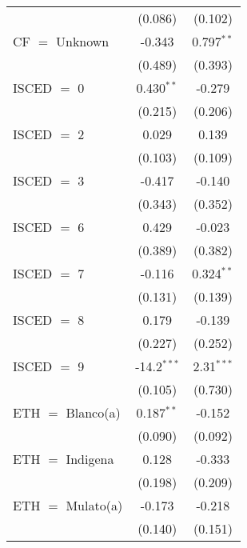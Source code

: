 \begin{table}[htbp!]
\begin{adjustbox}{width = 1\textwidth, max height = 0.95\textheight, center}
\begin{threeparttable}[b]
\begin{tabular}{lcc}
                                           & (0.086)        & (0.102)\\   
            CF $=$ Unknown                 & -0.343         & 0.797$^{**}$\\   
                                           & (0.489)        & (0.393)\\   
            ISCED $=$ 0                    & 0.430$^{**}$   & -0.279\\   
                                           & (0.215)        & (0.206)\\   
            ISCED $=$ 2                    & 0.029          & 0.139\\   
                                           & (0.103)        & (0.109)\\   
            ISCED $=$ 3                    & -0.417         & -0.140\\   
                                           & (0.343)        & (0.352)\\   
            ISCED $=$ 6                    & 0.429          & -0.023\\   
                                           & (0.389)        & (0.382)\\   
            ISCED $=$ 7                    & -0.116         & 0.324$^{**}$\\   
                                           & (0.131)        & (0.139)\\   
            ISCED $=$ 8                    & 0.179          & -0.139\\   
                                           & (0.227)        & (0.252)\\   
            ISCED $=$ 9                    & -14.2$^{***}$  & 2.31$^{***}$\\   
                                           & (0.105)        & (0.730)\\   
            ETH $=$ Blanco(a)              & 0.187$^{**}$   & -0.152\\   
                                           & (0.090)        & (0.092)\\   
            ETH $=$ Indigena               & 0.128          & -0.333\\   
                                           & (0.198)        & (0.209)\\   
            ETH $=$ Mulato(a)              & -0.173         & -0.218\\   
                                           & (0.140)        & (0.151)\\   

\end{tabular}
\end{threeparttable}
\end{adjustbox}
\end{table}
